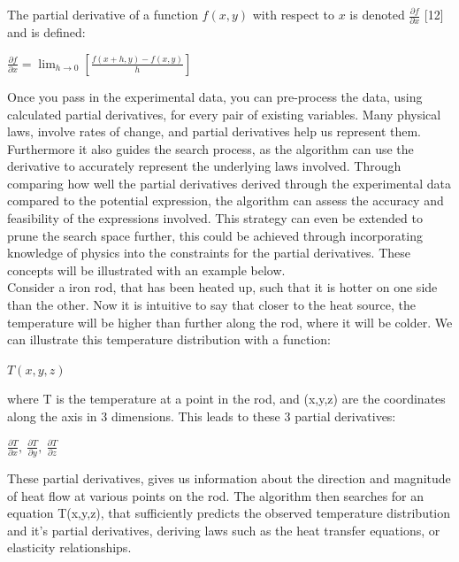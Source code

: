 \documentclass{article}
\begin{document}
The partial derivative of a function $f(x,y)$ with respect to $x$ is denoted $\frac{\partial f}{\partial x}$ [12] and is defined: \\ 

\begin{center}

  $\frac{\partial f}{\partial x} = \lim_{h \to 0} \left[ \frac{f(x+h, y) - f(x,y)}{h} \right]$
\end{center}


Once you pass in the experimental data, you can pre-process the data, using calculated partial derivatives, for every pair of existing variables. Many physical laws, involve rates of change, and partial
derivatives help us represent them. Furthermore it also guides the search process, as the algorithm can
use the derivative to accurately represent the underlying laws involved. Through comparing how well
the partial derivatives derived through the experimental data compared to the potential expression,
the algorithm can assess the accuracy and feasibility of the expressions involved. This strategy can
even be extended to prune the search space further, this could be achieved through incorporating
knowledge of physics into the constraints for the partial derivatives. These concepts will be illustrated
with an example below.\\


Consider a iron rod, that has been heated up, such that it is hotter on one side than the other. Now it is intuitive to say that closer to the heat source, the temperature will be higher than further along the rod, where it will be colder. We can illustrate this temperature distribution with a function:  \\

\begin{center}
$T(x,y,z)$
\end{center}

where T is the temperature at a point in the rod, and (x,y,z) are the coordinates along the axis in 3 dimensions. This leads to these 3 partial derivatives: \\ 

\begin{center}
 $\frac{\partial T}{\partial x}, \  \frac{\partial T}{\partial y}, \  \frac{\partial T}{\partial z}$
\end{center}

These partial derivatives, gives us information about the direction and magnitude of heat flow at various points on the rod. The algorithm then searches for an equation T(x,y,z), that sufficiently predicts the observed temperature distribution and it's partial derivatives, deriving laws such as the heat transfer equations, or elasticity relationships.\\ 
\end{document}
